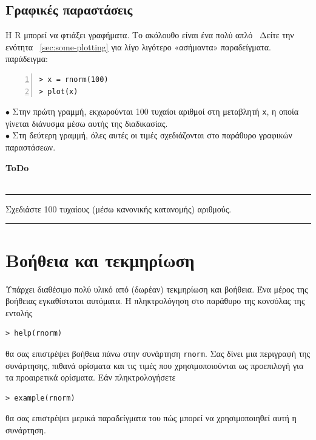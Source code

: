 \documentclass[a4paper,10pt,twocolumn]{article}
\makeatletter
\newenvironment{ToDo} {
  \begin{flushright}
    \hfill
    \begin{minipage}{0.9\columnwidth}
    \textsf{\textbf{ToDo}} \\
      \vspace{-0.7cm}\\
      {\color{Gray}\rule[-0.05cm]{\columnwidth}{1.5pt}}} {
      {\color{Gray}\rule[0.3cm]{\columnwidth}{1.5pt}}
    \end{minipage}
    \vspace{0.3cm}
  \end{flushright}
  }
\let\SF@@footnote\footnote
\def\footnote{\ifx\protect\@typeset@protect
 \expandafter\SF@@footnote
 \else
 \expandafter\SF@gobble@opt
 \fi
}
\edef\SF@gobble@opt{\noexpand\protect
 \expandafter\noexpand\csname SF@gobble@opt \endcsname}
\makeatother
\begin{document}
\subsection{Γραφικές παραστάσεις}

Η R μπορεί να φτιάξει γραφήματα. Το ακόλουθο είναι ένα πολύ απλό~\footnote{Δείτε την ενότητα
~\ref{sec:some-plotting} για λίγο λιγότερο «ασήμαντα» παραδείγματα.}
παράδειγμα:
\begin{Verbatim}[frame=single,numbers=left,gobble=0, xleftmargin=0.35cm, numbersep=0.1cm]
> x = rnorm(100)
> plot(x)
\end{Verbatim}

\noindent $\bullet$ Στην πρώτη γραμμή, εκχωρούνται 100 τυχαίοι αριθμοί στη μεταβλητή \texttt{x}, η οποία
γίνεται διάνυσμα μέσω αυτής της διαδικασίας. \\
\noindent $\bullet$ Στη δεύτερη γραμμή, όλες αυτές οι τιμές σχεδιάζονται στο παράθυρο γραφικών παραστάσεων.\\

\begin{ToDo}
Σχεδιάστε 100 τυχαίους (μέσω κανονικής κατανομής) αριθμούς.\\
\end{ToDo}


\section{Βοήθεια και τεκμηρίωση}
\label{sec:help}

Υπάρχει διαθέσιμο πολύ υλικό από (δωρέαν) τεκμηρίωση και βοήθεια. Ένα μέρος της βοήθειας εγκαθίσταται
αυτόματα. Η πληκτρολόγηση στο παράθυρο της κονσόλας της εντολής
\begin{Verbatim}[frame=single,gobble=0]
> help(rnorm)
\end{Verbatim}
θα σας επιστρέψει βοήθεια πάνω στην συνάρτηση \texttt{rnorm}. Σας δίνει μια περιγραφή της συνάρτησης,
πιθανά ορίσματα και τις τιμές που χρησιμοποιούνται ως προεπιλογή για τα προαιρετικά ορίσματα. Εάν
πληκτρολογήσετε
\begin{Verbatim}[frame=single,gobble=0]
> example(rnorm)
\end{Verbatim}
θα σας επιστρέψει μερικά παραδείγματα του πώς μπορεί να χρησιμοποιηθεί αυτή η συνάρτηση.
\end{document}
